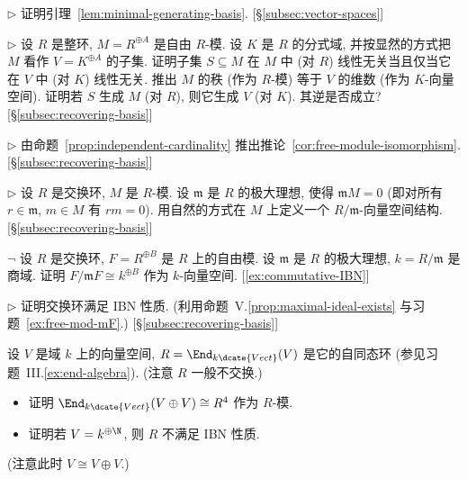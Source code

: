 \begin{prob}
\label{ex:minimal-generating-basis}
$\triangleright$ 证明引理~\ref{lem:minimal-generating-basis}. [§\ref{subsec:vector-spaces}]
\end{prob}

\begin{prob}
\label{ex:independence-frac-field}
$\triangleright$ 设 $R$ 是整环, $M=R^{\oplus A}$ 是自由 $R$-模. 设 $K$ 是 $R$ 的分式域, 并按显然的方式把 $M$ 看作 $V=K^{\oplus A}$ 的子集. 证明子集 $S\subseteq M$ 在 $M$ 中 (对 $R$) 线性无关当且仅当它在 $V$ 中 (对 $K$) 线性无关. 推出 $M$ 的秩 (作为 $R$-模) 等于 $V$ 的维数 (作为 $K$-向量空间). 证明若 $S$ 生成 $M$ (对 $R$), 则它生成 $V$ (对 $K$). 其逆是否成立? [§\ref{subsec:recovering-basis}]
\end{prob}

\begin{prob}
\label{ex:free-module-isomorphism}
$\triangleright$ 由命题~\ref{prop:independent-cardinality} 推出推论~\ref{cor:free-module-isomorphism}. [§\ref{subsec:recovering-basis}]
\end{prob}

\begin{prob}
\label{ex:mod-maximal-ideal}
$\triangleright$ 设 $R$ 是交换环, $M$ 是 $R$-模. 设 $\mathfrak{m}$ 是 $R$ 的极大理想, 使得 $\mathfrak{m}M=0$ (即对所有 $r\in\mathfrak{m}$, $m\in M$ 有 $rm=0$). 用自然的方式在 $M$ 上定义一个 $R/\mathfrak{m}$-向量空间结构. [§\ref{subsec:recovering-basis}]
\end{prob}

\begin{prob}
\label{ex:free-mod-mF}
$\neg$ 设 $R$ 是交换环, $F=R^{\oplus B}$ 是 $R$ 上的自由模. 设 $\mathfrak{m}$ 是 $R$ 的极大理想, $k=R/\mathfrak{m}$ 是商域. 证明 $F/\mathfrak{m}F\cong k^{\oplus B}$ 作为 $k$-向量空间. [\ref{ex:commutative-IBN}]
\end{prob}

\begin{prob}
\label{ex:commutative-IBN}
$\triangleright$ 证明交换环满足 IBN 性质. (利用命题~V.\ref{prop:maximal-ideal-exists} 与习题~\ref{ex:free-mod-mF}.) [§\ref{subsec:recovering-basis}]
\end{prob}

\begin{prob}
\label{ex:endomorphism-IBN}
设 $V$ 是域 $k$ 上的向量空间, $R=\End_{k\dcate{Vect}}(V)$ 是它的自同态环 (参见习题~III.\ref{ex:end-algebra}). (注意 $R$ 一般不交换.)
\begin{itemize}
\item 证明 $\End_{k\dcate{Vect}}(V\oplus V)\cong R^4$ 作为 $R$-模.
\item 证明若 $V=k^{\oplus\N}$, 则 $R$ 不满足 IBN 性质.
\end{itemize}
(注意此时 $V\cong V\oplus V$.)
\end{prob}

